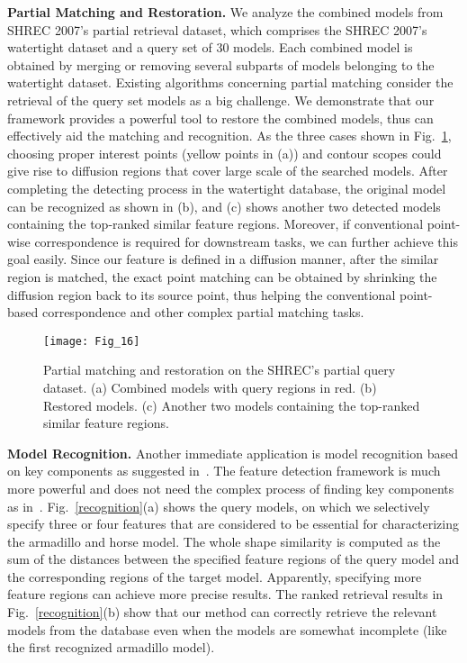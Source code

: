 \textbf{Partial Matching and Restoration.} We analyze the combined
models from SHREC 2007's partial retrieval dataset, which comprises
the SHREC 2007's watertight dataset and a query set of 30 models.
Each combined model is obtained by merging or removing several
subparts of models belonging to the watertight dataset. Existing
algorithms concerning partial matching consider the retrieval of the
query set models as a big challenge.  We demonstrate that our
framework provides a powerful tool to restore the combined models,
thus can effectively aid the matching and recognition. As the three
cases shown in Fig.~\ref{partial-query}, choosing proper interest
points (yellow points in (a)) and contour scopes could give rise to
diffusion regions that cover large scale of the searched models.
After completing the detecting process in the watertight database,
the original model can be recognized as shown in (b), and (c) shows
another two detected models containing the top-ranked similar feature
regions. Moreover, if conventional point-wise correspondence is
required for downstream tasks, we can further achieve this goal
easily. Since our feature is defined in a diffusion manner, after the
similar region is matched, the exact point matching can be obtained
by shrinking the diffusion region back to its source point, thus
helping the conventional point-based correspondence and other complex
partial matching tasks.

\begin{figure}[!to]
\texttt{[image: Fig\_16]}
\caption[Partial shape matching and restoration.]
 {Partial matching and restoration on the SHREC's partial query
  dataset. (a) Combined models with query regions in red. (b) Restored
  models.  (c) Another two models containing the top-ranked similar
  feature regions.}
\label{partial-query}
\end{figure}

\textbf{Model Recognition.} Another immediate application is model
recognition based on key components as suggested
in~\cite{Sipiran:2012}. The feature detection framework is much more
powerful and does not need the complex process of finding key
components as in~\cite{Sipiran:2012}.  Fig.~\ref{recognition}(a) shows
the query models, on which we selectively specify three or four
features that are considered to be essential for characterizing the
armadillo and horse model. The whole shape similarity is computed as
the sum of the distances between the specified feature regions of the
query model and the corresponding regions of the target model.
Apparently, specifying more feature regions can achieve more precise
results. The ranked retrieval results in Fig.~\ref{recognition}(b)
show that our method can correctly retrieve the relevant models from
the database even when the models are somewhat incomplete (like the
first recognized armadillo model).

